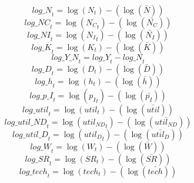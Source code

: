 \begin{dmath}
{log\_N}_{t}=\log\left({{N}}_{t}\right)-(\log\left(\bar{{N}}\right))
\end{dmath}
\begin{dmath}
{log\_NC}_{t}=\log\left({{N_C}}_{t}\right)-(\log\left(\bar{{N_C}}\right))
\end{dmath}
\begin{dmath}
{log\_NI}_{t}=\log\left({{N_I}}_{t}\right)-(\log\left(\bar{{N_I}}\right))
\end{dmath}
\begin{dmath}
{log\_K}_{t}=\log\left({{K}}_{t}\right)-(\log\left(\bar{{K}}\right))
\end{dmath}
\begin{dmath}
{log\_Y\_N}_{t}={log\_Y}_{t}-{log\_N}_{t}
\end{dmath}
\begin{dmath}
{log\_D}_{t}=\log\left({{D}}_{t}\right)-(\log\left(\bar{{D}}\right))
\end{dmath}
\begin{dmath}
{log\_h}_{t}=\log\left({h}_{t}\right)-(\log\left(\bar{h}\right))
\end{dmath}
\begin{dmath}
{log\_p\_I}_{t}=\log\left({{p_I}}_{t}\right)-(\log\left(\bar{{p_I}}\right))
\end{dmath}
\begin{dmath}
{log\_util}_{t}=\log\left({{util}}_{t}\right)-(\log\left(\bar{{util}}\right))
\end{dmath}
\begin{dmath}
{log\_util\_ND}_{t}=\log\left({{util_{ND}}}_{t}\right)-(\log\left(\bar{{util_{ND}}}\right))
\end{dmath}
\begin{dmath}
{log\_util\_D}_{t}=\log\left({{util_D}}_{t}\right)-(\log\left(\bar{{util_D}}\right))
\end{dmath}
\begin{dmath}
{log\_W}_{t}=\log\left({{W}}_{t}\right)-(\log\left(\bar{{W}}\right))
\end{dmath}
\begin{dmath}
{log\_SR}_{t}=\log\left({{SR}}_{t}\right)-(\log\left(\bar{{SR}}\right))
\end{dmath}
\begin{dmath}
{log\_tech}_{t}=\log\left({{tech}}_{t}\right)-(\log\left(\bar{{tech}}\right))
\end{dmath}
